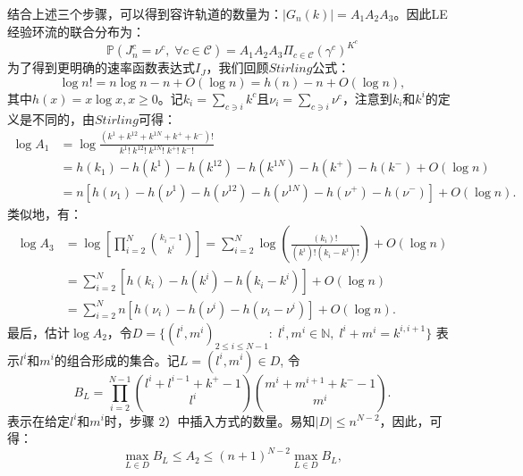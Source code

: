 结合上述三个步骤，可以得到容许轨道的数量为：$|G_n(k)|=A_1A_2A_3$。因此LE经验环流的联合分布为：
\begin{equation} \label{trajectories}
    \mathbb{P}\left(J^c_n=\nu^c,\;\forall c\in\mathcal{C}\right)
    = A_1 A_2 A_3 \Pi_{c\in\mathcal{C}} (\gamma^c)^{K^c}
\end{equation}
为了得到更明确的速率函数表达式$I_J$，我们回顾$Stirling$公式：
\begin{equation*}
    \log n! = n\log n-n+O(\log n)=h(n)-n+O(\log n),
\end{equation*}
其中$h(x)=x \log x, x \geqslant 0$。记$k_i=\sum_{c\ni i}k^c$且$\nu_i=\sum_{c\ni i}\nu^c$，注意到$k_i$和$k^i$的定义是不同的，由$Stirling$可得：
\begin{equation}\label{log A1}
    \begin{split}
    \log A_1&=\log\frac{(k^1+k^{12}+k^{1N}+k^{+}+k^{-})!}{k^1!\;k^{12}!\;k^{1N}!\;k^{+}!\;k^{-}!}\\
    &= h(k_1)-h(k^1)-h(k^{12})-h(k^{1N})-h(k^+)-h(k^-)+O(\log n)\\
    &= n\left[h(\nu_1)-h(\nu^1)-h(\nu^{12})-h(\nu^{1N})-h(\nu^+)-h(\nu^-)\right]+O(\log n).
    \end{split}
\end{equation}
类似地，有：
\begin{equation}\label{log A3}
    \begin{split}
    \log A_3&=\log\left[\prod_{i=2}^N\binom{k_i-1}{k^{i}}\right]
    =\sum_{i=2}^N\log\left(\frac{\left(k_i\right)!}{\left(k^i\right)!\left(k_i-k^i\right)!}\right)+O(\log n)\\
    &=\sum_{i=2}^N\left[h(k_i)-h(k^i)-h(k_i-k^i)\right]+O(\log n)\\
    &=\sum_{i=2}^Nn\left[h(\nu_i )-h(\nu^i)-h(\nu_i-\nu^i)\right]+O(\log n).
    \end{split}
\end{equation}
最后，估计$\log A_2$，令$D = \{(l^i,m^i)_{2\le i\le N-1}:\;l^i,m^i\in\mathbb{N},\;l^i+m^i=k^{i,i+1}\}$ 表示$l^i$和$m^i$的组合形成的集合。记$L = (l^i,m^i)\in D$, 令
\begin{equation*}
    B_L=\prod_{i=2}^{N-1}\binom{l^{i}+l^{i-1}+k^{+}-1}{l^{i}}\binom{m^{i}+m^{i+1}+k^{-}-1}{m^{i}}.
\end{equation*}
表示在给定$l^i$和$m^i$时，步骤 2）中插入方式的数量。易知$|D| \leqslant n^{N-2}$，因此，可得：
\begin{equation}\label{inequality}
    \max_{L\in D}B_L \le A_2 \le (n+1)^{N-2} \max_{L\in D}B_L,
\end{equation}
